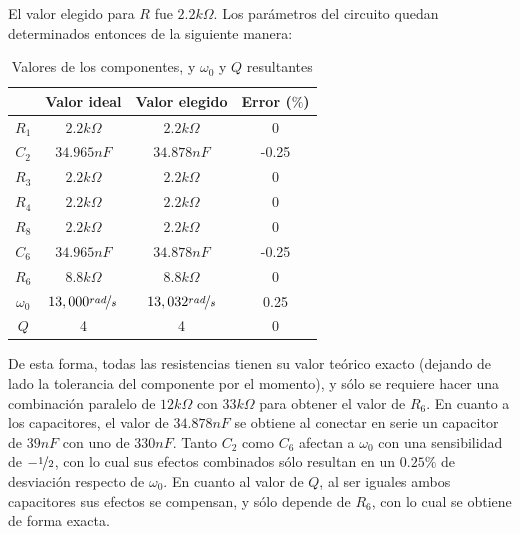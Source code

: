 \documentclass[../../tc_tp3_main.tex]{subfiles}
\begin{document}
El valor elegido para $R$ fue $2.2k\Omega$. Los par\'ametros del circuito quedan determinados entonces de la siguiente manera:


\begin{table}[H]
	\centering

	\begin{tabular}{|c|c|c|c|}
		\hline
		           		& Valor ideal                              & Valor elegido                      	& Error ($\%$) 	\\ \hline \hline
		$R_1$      		& $2.2k\Omega$                        & $2.2k\Omega$                       	& 0            	\\ \hline
		$C_2$      		& $34.965nF$				& $34.878nF$               		& -0.25         	\\ \hline
		$R_3$      		& $2.2k\Omega$                        & $2.2k\Omega$                       & 0            	\\ \hline
		$R_4$      		& $2.2k\Omega$                        & $2.2k\Omega$                       & 0            	\\ \hline
		$R_8$      		& $2.2k\Omega$                        & $2.2k\Omega$                       & 0            	\\ \hline
		$C_6$      		& $34.965nF$ 				& $34.878nF$               		& -0.25         	\\ \hline
		$R_6$      		& $8.8k\Omega$                      	& $8.8k\Omega$       			& 0            	\\ \hline
		$\omega_0$ 	& $13,000\nicefrac{rad}{s}$	&  $13,032 \nicefrac{rad}{s}$ 	& 0.25         	\\ \hline
		$Q$        		& 4                                           & 4                              		& 0            	\\ \hline
	\end{tabular}
	\caption{Valores de los componentes, y $\omega_0$ y $Q$ resultantes}
\end{table}



De esta forma, todas las resistencias tienen su valor te\'orico exacto (dejando de lado la tolerancia del componente por el momento), y s\'olo se requiere hacer una combinaci\'on paralelo de $12k\Omega$ con $33k\Omega$ para obtener el valor de $R_6$. En cuanto a los capacitores, el valor de $34.878nF$ se obtiene al conectar en serie un capacitor de $39nF$ con uno de $330nF$. Tanto $C_2$ como $C_6$ afectan a $\omega_0$ con una sensibilidad de $-\nicefrac{1}{2}$, con lo cual sus efectos combinados s\'olo resultan en un $0.25\%$ de desviaci\'on respecto de $\omega_0$. En cuanto al valor de $Q$, al ser iguales ambos capacitores sus efectos se compensan, y s\'olo depende de $R_6$, con lo cual se obtiene de forma exacta.  \par
\end{document}
